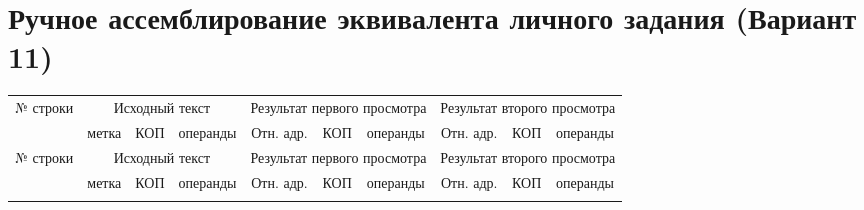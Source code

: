\documentclass[10pt, a4paper, landscape]{article}
\begin{document}
\section*{Ручное ассемблирование эквивалента личного задания (Вариант 11)}

\renewcommand{\arraystretch}{1.3}
\begin{longtable}{|c|l|l|l|c|l|l|c|l|l|}
\hline
\multirow{2}{*}{№ строки} & \multicolumn{3}{c|}{Исходный текст} & \multicolumn{3}{c|}{Результат первого просмотра} & \multicolumn{3}{c|}{Результат второго просмотра} \\
\cline{2-10}
& метка & КОП & операнды & Отн. адр. & КОП & операнды & Отн. адр. & КОП & операнды \\
\hline
\endfirsthead
\hline
\multirow{2}{*}{№ строки} & \multicolumn{3}{c|}{Исходный текст} & \multicolumn{3}{c|}{Результат первого просмотра} & \multicolumn{3}{c|}{Результат второго просмотра} \\
\cline{2-10}
& метка & КОП & операнды & Отн. адр. & КОП & операнды & Отн. адр. & КОП & операнды \\
\hline
\endhead
\hline
\endfoot
\hline
\endlastfoot


\end{longtable}
\end{document}
